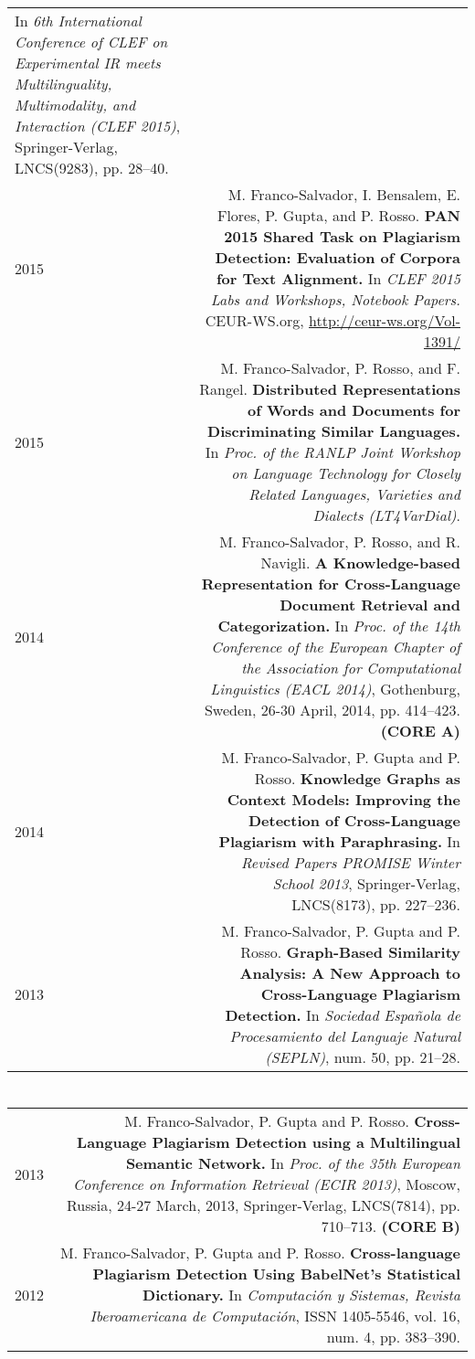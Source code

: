 \documentclass[10pt]{article}
\begin{document}
\begin{tabular}{L!{\VRule}R}
	In \emph{6th International Conference of CLEF on Experimental IR meets Multilinguality, Multimodality, and Interaction (CLEF 2015)}, Springer-Verlag, LNCS(9283), pp. 28--40. \vspace{5pt}\\
	2015&M. Franco-Salvador, I. Bensalem, E. Flores, P. Gupta, and P. Rosso. \textbf{PAN 2015 Shared Task on Plagiarism Detection: Evaluation of Corpora for Text Alignment.}
	In \emph{CLEF 2015 Labs and Workshops, Notebook Papers.} CEUR-WS.org, \href{http://ceur-ws.org/Vol-1391/}{http://ceur-ws.org/Vol-1391/} \vspace{5pt}\\
	2015&M. Franco-Salvador, P. Rosso, and F. Rangel. \textbf{Distributed Representations of Words and Documents for Discriminating Similar Languages.}
	In \emph{Proc. of the RANLP Joint Workshop on Language Technology for Closely Related Languages, Varieties and Dialects (LT4VarDial)}. \vspace{5pt}\\
	2014&M. Franco-Salvador, P. Rosso, and R. Navigli. \textbf{A Knowledge-based Representation for Cross-Language Document Retrieval and Categorization.}
	In \emph{Proc. of the 14th Conference of the European Chapter of the Association for Computational Linguistics (EACL 2014)}, Gothenburg, Sweden, 26-30 April, 2014, pp. 414--423. \textbf{(CORE A)} \vspace{5pt}\\
	2014&M. Franco-Salvador, P. Gupta and P. Rosso. \textbf{Knowledge Graphs as Context Models: Improving the Detection of Cross-Language Plagiarism with Paraphrasing.}
	In \emph{Revised Papers PROMISE Winter School 2013}, Springer-Verlag, LNCS(8173), pp. 227--236.\vspace{5pt}\\
	2013&M. Franco-Salvador, P. Gupta and P. Rosso. \textbf{Graph-Based Similarity Analysis: A New Approach to Cross-Language Plagiarism Detection.}
	In \emph{Sociedad Espa{\~n}ola de Procesamiento del Languaje Natural (SEPLN)}, num. 50, pp. 21--28. \vspace{5pt}\\
\end{tabular}

\section*{}
\begin{tabular}{L!{\VRule}R}
	2013&M. Franco-Salvador, P. Gupta and P. Rosso. \textbf{Cross-Language Plagiarism Detection using a Multilingual Semantic Network.}
	In \emph{Proc. of the 35th European Conference on Information Retrieval (ECIR 2013)}, Moscow, Russia, 24-27 March, 2013, Springer-Verlag, LNCS(7814), pp. 710--713. \textbf{(CORE B)}\vspace{5pt}\\
	2012&M. Franco-Salvador, P. Gupta and P. Rosso. \textbf{Cross-language Plagiarism Detection Using BabelNet's Statistical Dictionary.}
	In \emph{Computaci{\'o}n y Sistemas, Revista Iberoamericana de Computaci{\'o}n}, ISSN 1405-5546, vol. 16, num. 4, pp. 383--390.\vspace{5pt}\\
\end{tabular}
\end{document}

